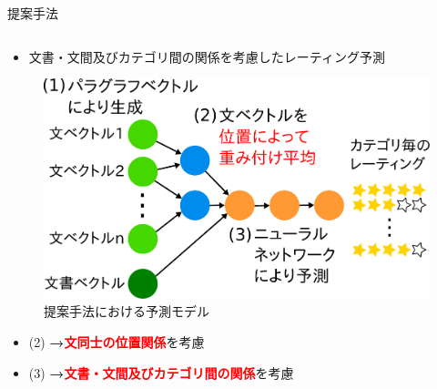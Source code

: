 \documentclass[unicode,10pt]{beamer}
\newlength{\mycolumnwidth}
\newcommand{\arrow}{\textcolor{ttiblue}{\textbf{→}}\hspace{1ex}}
\newcommand{\itemtitle}[1]{\textbf{#1}\\}
\newcommand{\fire}[1]{\textcolor{red}{\textbf{#1}}}
\begin{document}
\begin{frame}[t]
\begin{block}{提案手法}
  \begin{columns}[onlytextwidth,t]
    \begin{column}{\mycolumnwidth}
      \begin{itemize}
        \item 文書・文間及びカテゴリ間の関係を考慮したレーティング予測
      \end{itemize}
      \begin{figure}
        \includegraphics[width=0.8\linewidth]
                        {fig/model_with_detailed_processes.pdf}
        \caption*{提案手法における予測モデル}
      \end{figure}
      \begin{itemize}
        \item (2) \arrow \fire{文同士の位置関係}を考慮
        \item (3) \arrow \fire{文書・文間及びカテゴリ間の関係}を考慮
      \end{itemize}
    \end{column}


\end{columns}
\end{block}
\end{frame}
\end{document}
